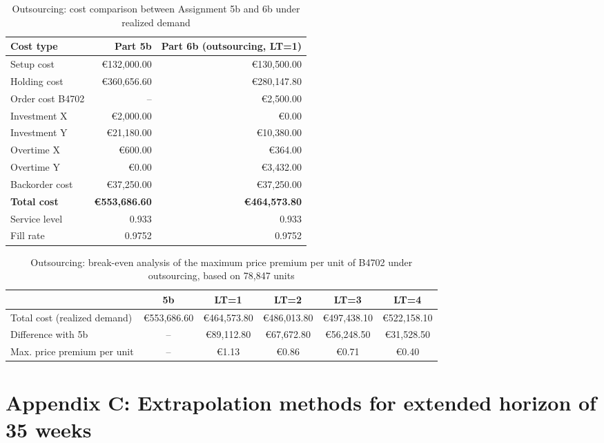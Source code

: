\documentclass[a4paper,faculty=eb,language=en,doctype=article,sftitles=false]{ugent-doc}
\begin{document}
\begin{table}[H]
\centering
\small
\begin{tabular}{lrr}
\toprule
\textbf{Cost type} & \textbf{Part 5b} & \textbf{Part 6b (outsourcing, LT=1)} \\
\midrule
Setup cost        & €132{,}000.00 & €130{,}500.00 \\
Holding cost      & €360{,}656.60 & €280{,}147.80 \\
Order cost B4702  & --            & €2{,}500.00 \\
Investment X      & €2{,}000.00   & €0.00 \\
Investment Y      & €21{,}180.00  & €10{,}380.00 \\
Overtime X        & €600.00       & €364.00 \\
Overtime Y        & €0.00         & €3{,}432.00 \\
Backorder cost    & €37{,}250.00  & €37{,}250.00 \\
\midrule
\textbf{Total cost} & \textbf{€553{,}686.60} & \textbf{€464{,}573.80} \\
Service level & 0.933 & 0.933 \\
Fill rate & 0.9752 & 0.9752 \\
\bottomrule
\end{tabular}
\caption{Outsourcing: cost comparison between Assignment 5b and 6b under realized demand}
\end{table}

\begin{table}[H]
\centering
\small
\setlength{\tabcolsep}{4pt}
\begin{tabular}{lccccc}
\toprule
 & \textbf{5b} & \textbf{LT=1} & \textbf{LT=2} & \textbf{LT=3} & \textbf{LT=4} \\
\midrule
Total cost (realized demand) 
& €553{,}686.60 
& €464{,}573.80 
& €486{,}013.80 
& €497{,}438.10 
& €522{,}158.10 \\

Difference with 5b 
& -- 
& €89{,}112.80 
& €67{,}672.80 
& €56{,}248.50 
& €31{,}528.50 \\

Max. price premium per unit 
& -- 
& €1.13 
& €0.86 
& €0.71 
& €0.40 \\
\bottomrule
\end{tabular}
\caption{Outsourcing: break-even analysis of the maximum price premium per unit of B4702 under outsourcing, based on 78{,}847 units}
\end{table}

\section*{Appendix C: Extrapolation methods for extended horizon of 35 weeks}
\end{document}
